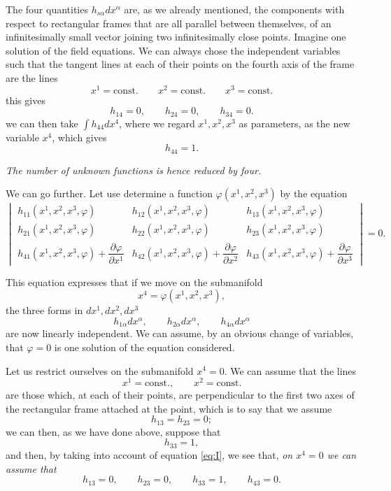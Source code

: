 \documentclass[leqno,11pt]{article}
\newcommand{\pd}{\partial}
\theoremstyle{shape1}
\theoremstyle{shape0}
\theoremstyle{shape2}
\theoremstyle{definition}
\begin{document}
The four quantities $h_{s\alpha}dx^{\alpha}$ are, as we already mentioned, the components with respect to rectangular frames that are all parallel between themselves, of an infinitesimally small vector joining two infinitesimally close points. Imagine one solution of the field equations. We can always chose the independent variables such that the tangent lines at each of their points on the fourth axis of the frame are the lines
\[
x^{1}=\text{const.}\qquad
x^{2}=\text{const.}\qquad
x^{3}=\text{const.}
\]
this gives
\[
h_{14}=0,\qquad h_{24}=0,\qquad h_{34}=0.
\]
we can then take $\int h_{44}dx^{4}$, where we regard $x^{1},x^{2},x^{3}$ as parameters, as the new variable $x^{4}$, which gives
\[
h_{44}=1.
\]

\emph{The number of unknown functions is hence reduced by four.}

We can go further. Let use determine a function $\varphi(x^{1},x^{2},x^{3})$ by the equation
\[
\begin{vmatrix}
  h_{11}(x^{1},x^{2},x^{3},\varphi)&  h_{12}(x^{1},x^{2},x^{3},\varphi)&  h_{13}(x^{1},x^{2},x^{3},\varphi)\\
  h_{21}(x^{1},x^{2},x^{3},\varphi)&  h_{22}(x^{1},x^{2},x^{3},\varphi)&  h_{23}(x^{1},x^{2},x^{3},\varphi)\\
  h_{41}(x^{1},x^{2},x^{3},\varphi)+\dfrac{\pd\varphi}{\pd x^{1}}&  h_{42}(x^{1},x^{2},x^{3},\varphi)+\dfrac{\pd\varphi}{\pd x^{2}}&  h_{43}(x^{1},x^{2},x^{3},\varphi)+\dfrac{\pd\varphi}{\pd x^{3}}
\end{vmatrix}=0.
\]

This equation expresses that if we move on the submanifold
\[
x^{4}=\varphi(x^{1},x^{2},x^{3}),
\]
the three forms in $dx^{1},dx^{2},dx^{3}$
\[
h_{1\alpha}dx^{\alpha},\qquad h_{2\alpha}dx^{\alpha},\qquad h_{4\alpha}dx^{\alpha}
\]
are now linearly independent. We can assume, by an obvious change of variables, that $\varphi=0$ is one solution of the equation considered.

Let us restrict ourselves on the submanifold $x^{4}=0$. We can assume that the lines
\[
x^{1}=\text{const.},\qquad x^{2}=\text{const.}
\]
are those which, at each of their points, are perpendicular to the first two axes of the rectangular frame attached at the point, which is to say that we assume
\[
h_{13}=h_{23}=0;
\]
we can then, as we have done above, suppose that
\[
h_{33}=1,
\]
and then, by taking into account of equation \eqref{eq:I}, we see that, \emph{on $x^{4}=0$ we can assume that}
\[
h_{13}=0,\qquad h_{23}=0,\qquad h_{33}=1,\qquad h_{43}=0.
\]
\end{document}
